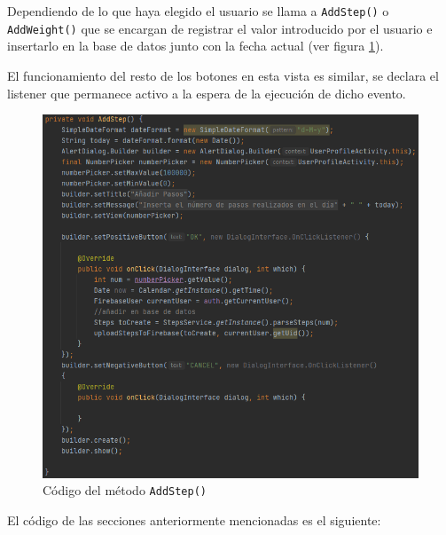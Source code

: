 Dependiendo de lo que haya elegido el usuario se llama a \texttt{AddStep()} o \texttt{AddWeight()} que se encargan de registrar el valor introducido por el usuario e insertarlo en la base de datos junto con la fecha actual (ver figura \ref{fig:addstep}).

El funcionamiento del resto de los botones en esta vista es similar, se declara el listener que permanece activo a la espera de la ejecución de dicho evento.

\begin{figure}[H]
    \centering
    \includegraphics[width=\textwidth]{Images/Capitulo7/addstep.png}
    \caption{Código del método \texttt{AddStep()}}
    \label{fig:addstep}
\end{figure}

El código de las secciones anteriormente mencionadas es el siguiente:

